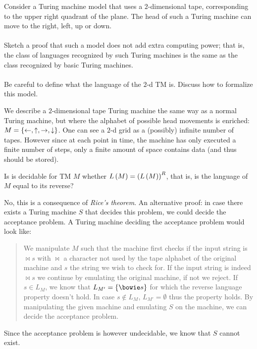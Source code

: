 \documentclass{article}
\begin{document}
\begin{exercise}
Consider a Turing machine model that uses a $2$-dimensional tape, corresponding to the upper right quadrant of the plane. The head of such a Turing machine can move to the right, left, up or down.
\paragraph{}
Sketch a proof that such a model does not add extra computing power; that is, the class of languages recognized by such Turing machines is the same as the class recognized by basic Turing machines.
\paragraph{}
Be careful to define what the language of the $2$-d TM is. Discuss how to formalize this model.
\begin{answer}
We describe a $2$-dimensional tape Turing machine the same way as a normal Turing machine, but where the alphabet of possible head movements is enriched: $M=\left\{ \leftarrow,\uparrow,\rightarrow,\downarrow \right\}$.
One can see a $2$-d grid as a (possibly) infinite number of tapes. However since at each point in time, the machine has only executed a finite number of steps, only a finite amount of space contains data (and thus should be stored).
\end{answer}
\end{exercise}

\begin{exercise}
Is is decidable for TM $M$ whether $L\left( M \right)=\left( L\left( M \right) \right)^R$, that is, is the language of $M$ equal to its reverse?
\begin{answer}
No, this is a consequence of \emph{Rice's theorem}. An alternative proof: in case there exists a Turing machine $S$ that decides this problem, we could decide the acceptance problem. A Turing machine deciding the acceptance problem would look like:
\begin{quote}
We manipulate $M$ such that the machine first checks if the input string is $\bowtie s$ with $\bowtie$ a character not used by the tape alphabet of the original machine and $s$ the string we wish to check for. If the input string is indeed $\bowtie s$ we continue by emulating the original machine, if not we reject. If $s\in L_M$, we know that $L_{M'}=\accl{\bowie s}$ for which the reverse language property doesn't hold. In case $s\notin L_M$, $L_{M'}=\emptyset$ thus the property holds. By manipulating the given machine and emulating $S$ on the machine, we can decide the acceptance problem.
\end{quote}
Since the acceptance problem is however undecidable, we know that $S$ cannot exist.
\end{answer}
\end{exercise}
\end{document}
